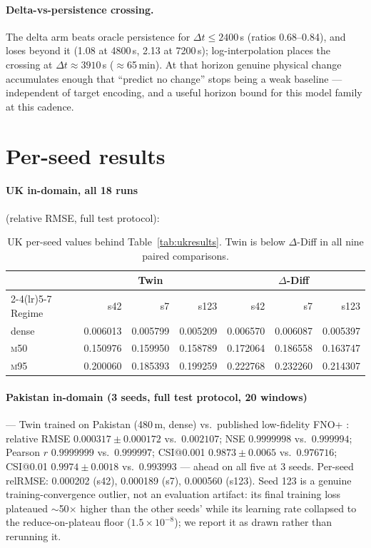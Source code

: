 \documentclass[11pt]{article}
\newcommand{\ours}{\mbox{$\Delta$-Diff}}
\newcommand{\twin}{\mbox{Twin}}
\newcommand{\mfifty}{\textsc{m50}}
\newcommand{\mninetyfive}{\textsc{m95}}
\begin{document}
\paragraph{Delta-vs-persistence crossing.} The delta arm beats oracle
persistence for $\Delta t \le 2400$\,s (ratios 0.68--0.84), and loses
beyond it (1.08 at 4800\,s, 2.13 at 7200\,s); log-interpolation places
the crossing at $\Delta t \approx 3910$\,s ($\approx$65\,min). At that
horizon genuine physical change accumulates enough that ``predict no
change'' stops being a weak baseline --- independent of target encoding,
and a useful horizon bound for this model family at this cadence.

\section{Per-seed results}
\label{app:perseed}

\paragraph{UK in-domain, all 18 runs} (relative RMSE, full test
protocol):

\begin{table}[H]
\centering
\caption{UK per-seed values behind Table~\ref{tab:ukresults}. \twin{}
is below \ours{} in all nine paired comparisons.}
\begin{tabular}{lrrrrrr}
\toprule
 & \multicolumn{3}{c}{\twin{}} & \multicolumn{3}{c}{\ours{}} \\
\cmidrule(lr){2-4}\cmidrule(lr){5-7}
Regime & s42 & s7 & s123 & s42 & s7 & s123 \\
\midrule
dense & 0.006013 & 0.005799 & 0.005209 & 0.006570 & 0.006087 & 0.005397 \\
\mfifty{} & 0.150976 & 0.159950 & 0.158789 & 0.172064 & 0.186558 & 0.163747 \\
\mninetyfive{} & 0.200060 & 0.185393 & 0.199259 & 0.222768 & 0.232260 & 0.214307 \\
\bottomrule
\end{tabular}
\end{table}

\paragraph{Pakistan in-domain (3 seeds, full test protocol, 20 windows)}
--- \twin{} trained on Pakistan (480\,m, dense) vs.\ published
low-fidelity FNO+ \citep{floodcastbench2025}: relative RMSE
$0.000317\pm0.000172$ vs.\ $0.002107$; NSE $0.9999998$ vs.\ $0.999994$;
Pearson $r$ $0.9999999$ vs.\ $0.999997$; CSI@0.001 $0.9873\pm0.0065$
vs.\ $0.976716$; CSI@0.01 $0.9974\pm0.0018$ vs.\ $0.993993$ --- ahead on
all five at 3 seeds. Per-seed relRMSE: 0.000202 (s42), 0.000189 (s7),
0.000560 (s123). Seed 123 is a genuine training-convergence outlier, not
an evaluation artifact: its final training loss plateaued $\sim$50$\times$
higher than the other seeds' while its learning rate collapsed to the
reduce-on-plateau floor ($1.5\times10^{-8}$); we report it as drawn
rather than rerunning it.
\end{document}
